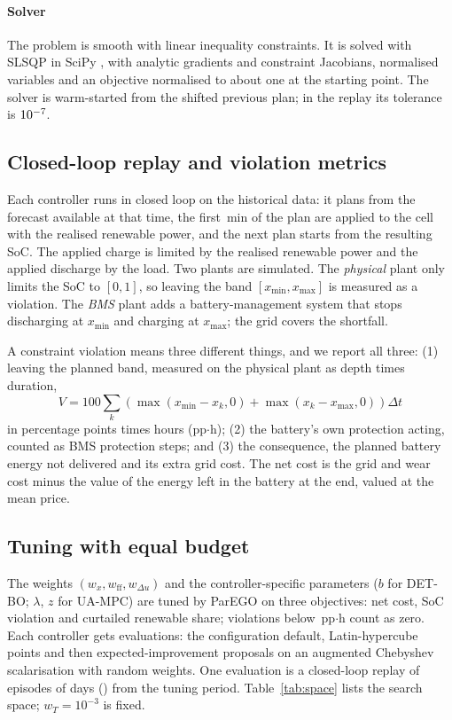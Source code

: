 \documentclass[a4paper,fleqn]{cas-dc}
\newcommand{\pph}{\,pp$\cdot$h\xspace}
\newcommand{\DETBO}{DET-BO\xspace}
\newcommand{\UA}{UA-MPC\xspace}
\begin{document}
\paragraph{Solver} The problem is smooth with linear inequality constraints. It is solved with SLSQP \cite{kraft1988software} in SciPy \cite{virtanen2020scipy}, with analytic gradients and constraint Jacobians, normalised variables and an objective normalised to about one at the starting point. The solver is warm-started from the shifted previous plan; in the replay its tolerance is $10^{-7}$.

\subsection{Closed-loop replay and violation metrics}\label{sec:replay}
Each controller runs in closed loop on the historical data: it plans from the forecast available at that time, the first \replanmin\,min of the plan are applied to the cell with the realised renewable power, and the next plan starts from the resulting SoC. The applied charge is limited by the realised renewable power and the applied discharge by the load. Two plants are simulated. The \emph{physical} plant only limits the SoC to $[0,1]$, so leaving the band $[x_{\min},x_{\max}]$ is measured as a violation. The \emph{BMS} plant adds a battery-management system that stops discharging at $x_{\min}$ and charging at $x_{\max}$; the grid covers the shortfall.

A constraint violation means three different things, and we report all three:
(1) leaving the planned band, measured on the physical plant as depth times duration,
\begin{equation}
V=100\sum_k\left(\max(x_{\min}-x_k,0)+\max(x_k-x_{\max},0)\right)\Delta t
\end{equation}
in percentage points times hours (pp$\cdot$h);
(2) the battery's own protection acting, counted as BMS protection steps; and (3) the consequence, the planned battery energy not delivered and its extra grid cost. The net cost is the grid and wear cost minus the value of the energy left in the battery at the end, valued at the mean price.

\subsection{Tuning with equal budget}\label{sec:tuning}
The weights $(w_x,w_{\mathrm{ff}},w_{\Delta u})$ and the controller-specific parameters ($b$ for \DETBO; $\lambda$, $z$ for \UA) are tuned by ParEGO \cite{knowles2006parego} on three objectives: net cost, SoC violation and curtailed renewable share; violations below \violNoise\pph count as zero. Each controller gets \trials evaluations: the configuration default, \initpoints Latin-hypercube points \cite{mckay1979comparison} and then expected-improvement proposals \cite{jones1998efficient} on an augmented Chebyshev scalarisation with random weights. One evaluation is a closed-loop replay of \episodes episodes of \episodeDays days (\episodeList) from the tuning period. Table~\ref{tab:space} lists the search space; $w_T=10^{-3}$ is fixed.
\end{document}
